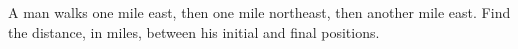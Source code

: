 A man walks one mile east, then one mile northeast, then another mile east. Find the distance, in miles, between his initial and final positions.
